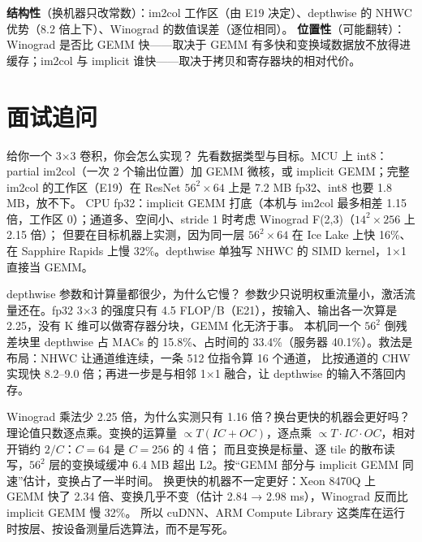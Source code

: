 \documentclass[11pt,a4paper]{ctexart}
\begin{document}
\begin{findingbox}[：哪些结论跟着机器走]
\textbf{结构性}（换机器只改常数）：im2col 工作区（由 E19 决定）、depthwise 的 NHWC 优势（8.2 倍上下）、Winograd 的数值误差（逐位相同）。
\textbf{位置性}（可能翻转）：Winograd 是否比 GEMM 快——取决于 GEMM 有多快和变换域数据放不放得进缓存；im2col 与 implicit 谁快——取决于拷贝和寄存器块的相对代价。
\end{findingbox}

\section{面试追问}\label{sec:iq}

\begin{iqbox}{给你一个 3×3 卷积，你会怎么实现？}
先看数据类型与目标。MCU 上 int8：partial im2col（一次 2 个输出位置）加 GEMM 微核，或 implicit GEMM；完整 im2col 的工作区（E19）在 ResNet $56^2\times64$ 上是 7.2 MB fp32、int8 也要 1.8 MB，放不下。
CPU fp32：implicit GEMM 打底（本机与 im2col 最多相差 1.15 倍，工作区 0）；通道多、空间小、stride 1 时考虑 Winograd F(2,3)（$14^2\times256$ 上 2.15 倍）；
但要在目标机器上实测，因为同一层 $56^2\times64$ 在 Ice Lake 上快 16\%、在 Sapphire Rapids 上慢 32\%。depthwise 单独写 NHWC 的 SIMD kernel，1×1 直接当 GEMM。
\end{iqbox}

\begin{iqbox}{depthwise 参数和计算量都很少，为什么它慢？}
参数少只说明权重流量小，激活流量还在。fp32 3×3 的强度只有 4.5 FLOP/B（E21），按输入、输出各一次算是 2.25，没有 K 维可以做寄存器分块，GEMM 化无济于事。
本机同一个 $56^2$ 倒残差块里 depthwise 占 MACs 的 15.8\%、占时间的 33.4\%（服务器 40.1\%）。救法是布局：NHWC 让通道维连续，一条 512 位指令算 16 个通道，
比按通道的 CHW 实现快 8.2--9.0 倍；再进一步是与相邻 1×1 融合，让 depthwise 的输入不落回内存。
\end{iqbox}

\begin{iqbox}{Winograd 乘法少 2.25 倍，为什么实测只有 1.16 倍？换台更快的机器会更好吗？}
理论值只数逐点乘。变换的运算量 $\propto T(IC+OC)$，逐点乘 $\propto T\cdot IC\cdot OC$，相对开销约 $2/C$：$C = 64$ 是 $C = 256$ 的 4 倍；
而且变换是标量、逐 tile 的散布读写，$56^2$ 层的变换域缓冲 6.4 MB 超出 L2。按“GEMM 部分与 implicit GEMM 同速”估计，变换占了一半时间。
换更快的机器不一定更好：Xeon 8470Q 上 GEMM 快了 2.34 倍、变换几乎不变（估计 2.84 → 2.98 ms），Winograd 反而比 implicit GEMM 慢 32\%。
所以 cuDNN、ARM Compute Library 这类库在运行时按层、按设备测量后选算法，而不是写死。
\end{iqbox}
\end{document}
